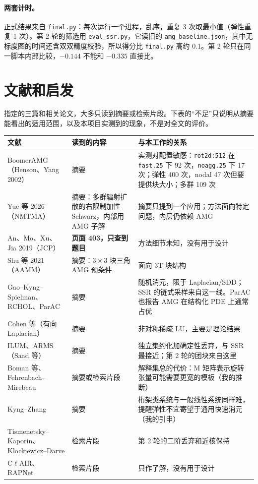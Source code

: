\documentclass[11pt,a4paper]{ctexart}
\begin{document}
\paragraph{两套计时。}正式结果来自 \texttt{final.py}：每次运行一个进程，乱序，重复 3 次取最小值（弹性重复 1 次）。第 2 轮的筛选用 \texttt{eval\_ssr.py}，它读旧的 \texttt{amg\_baseline.json}，其中无标度图的时间还含双双精度校验，所以得分比 \texttt{final.py} 高约 0.1。第 2 轮只在同一脚本内部比较，$-0.144$ 不能和 $-0.335$ 直接比。

\section{文献和启发}
指定的三篇和相关论文，大多只读到摘要或检索片段。下表的“不足”只说明从摘要能看出的适用范围，以及本项目实测到的现象，不是对全文的评价。

\begin{table}[H]
\centering\footnotesize
\begin{tabular}{p{3.6cm}p{5.0cm}p{6.6cm}}
\toprule
文献 & 读到的内容 & 与本工作的关系 \\
\midrule
BoomerAMG（Henson、Yang 2002） & 摘要 & 实测对配置敏感：\texttt{rot2d:512} 在 \texttt{fast.25} 下 92 次，\texttt{noagg.25} 下 17 次；弹性 400 次，nodal 47 次但要提供块大小；多群 109 次 \\
Yue 等 2026（NMTMA） & 摘要：多群辐射扩散的右限制加性 Schwarz，内部用 AMG 子解 & 摘要只提到一个应用；方法面向特定问题，内层仍依赖 AMG \\
An、Mo、Xu、Jia 2019（JCP） & \textbf{页面 403，只查到题目} & 方法细节未知，没有用于设计 \\
Shu 等 2021（AAMM） & 摘要：$3\times3$ 块三角 AMG 预条件 & 面向 3T 块结构 \\
Gao--Kyng--Spielman、RCHOL、ParAC & 摘要 & 随机消元，限于 Laplacian/SDD；SSR 的链式采样来自这一线。ParAC 也报告 AMG 在结构化 PDE 上通常占优 \\
Cohen 等（有向 Laplacian） & 摘要 & 非对称稀疏 LU，主要是理论结果 \\
ILUM、ARMS（Saad 等） & 摘要 & 独立集约化加确定性丢弃，与 SSR 最接近；第 2 轮的团块来自这里 \\
Boman 等、Fehrenbach--Mirebeau & 摘要或检索片段 & 解释集总的代价：M 矩阵表示旋转张量可能需要更宽的模板（我的推断） \\
Kyng--Zhang & 摘要 & 桁架类系统与一般线性系统同样难，提醒弹性不宜寄望于通用快速消元（我的引申） \\
Tismenetsky--Kaporin、Klockiewicz--Darve & 检索片段 & 第 2 轮的二阶丢弃和近核保持 \\
C$\ell$AIR、RAPNet & 检索片段 & 只作了解，没有用于设计 \\
\bottomrule
\end{tabular}
\end{table}
\end{document}
